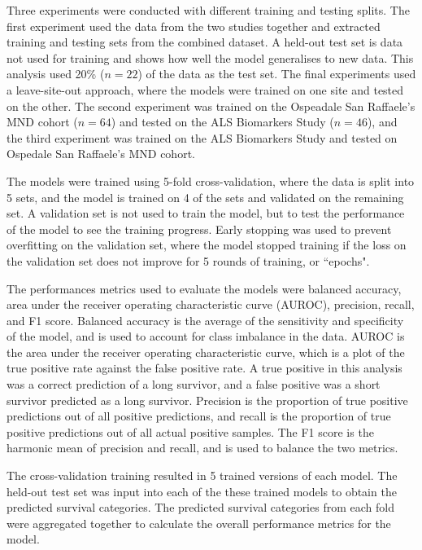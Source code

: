 Three experiments were conducted with different training and testing splits.
The first experiment used the data from the two studies together and extracted training and testing sets from the combined dataset.
A held-out test set is data not used for training and shows how well the model generalises to new data.
This analysis used 20\% ($n=22$) of the data as the test set.
The final experiments used a leave-site-out approach, where the models were trained on one site and tested on the other.
The second experiment was trained on the Ospeadale San Raffaele's MND cohort ($n=64$) and tested on the ALS Biomarkers Study ($n=46$), and the third experiment was trained on the ALS Biomarkers Study and tested on Ospedale San Raffaele's MND cohort.

The models were trained using 5-fold cross-validation, where the data is split into 5 sets, and the model is trained on 4 of the sets and validated on the remaining set.
A validation set is not used to train the model, but to test the performance of the model to see the training progress.
Early stopping was used to prevent overfitting on the validation set, where the model stopped training if the loss on the validation set does not improve for 5 rounds of training, or ``epochs".

The performances metrics used to evaluate the models were balanced accuracy, area under the receiver operating characteristic curve (AUROC), precision, recall, and F1 score.
Balanced accuracy is the average of the sensitivity and specificity of the model, and is used to account for class imbalance in the data.
AUROC is the area under the receiver operating characteristic curve, which is a plot of the true positive rate against the false positive rate.
A true positive in this analysis was a correct prediction of a long survivor, and a false positive was a short survivor predicted as a long survivor.
Precision is the proportion of true positive predictions out of all positive predictions, and recall is the proportion of true positive predictions out of all actual positive samples.
The F1 score is the harmonic mean of precision and recall, and is used to balance the two metrics.

The cross-validation training resulted in 5 trained versions of each model.
The held-out test set was input into each of the these trained models to obtain the predicted survival categories.
The predicted survival categories from each fold were aggregated together to calculate the overall performance metrics for the model.


